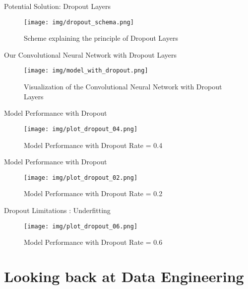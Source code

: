 \documentclass[aspectratio=169]{beamer}
\begin{document}
{    \begin{frame}{Potential Solution: Dropout Layers}
        \begin{figure}
            \centering
            \texttt{[image: img/dropout\_schema.png]}
            \caption{Scheme explaining the principle of Dropout Layers}
        \end{figure}    
    \end{frame}

    
    \begin{frame}{Our Convolutional Neural Network with Dropout Layers}
        \begin{figure}
            \centering
            \texttt{[image: img/model\_with\_dropout.png]}
            \caption{Visualization of the Convolutional Neural Network with Dropout Layers}
        \end{figure}    
    \end{frame}
    
    \begin{frame}{Model Performance with Dropout}
        \begin{figure}
            \centering
            \texttt{[image: img/plot\_dropout\_04.png]}
            \caption{Model Performance with Dropout Rate = 0.4}
        \end{figure}    
    \end{frame}

    \begin{frame}{Model Performance with Dropout}
        \begin{figure}
            \centering
            \texttt{[image: img/plot\_dropout\_02.png]}
            \caption{Model Performance with Dropout Rate = 0.2}
        \end{figure}    
    \end{frame}


    \begin{frame}{Dropout Limitations : Underfitting}
        \begin{figure}
            \centering
            \texttt{[image: img/plot\_dropout\_06.png]}
            \caption{Model Performance with Dropout Rate = 0.6}
        \end{figure}    
    \end{frame}


\section{Looking back at Data Engineering}

}
\end{document}
